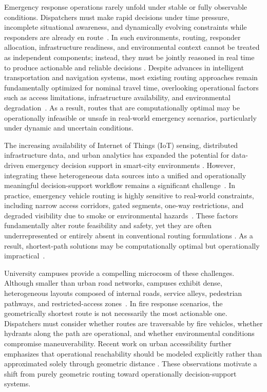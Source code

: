 Emergency response operations rarely unfold under stable or fully observable conditions. Dispatchers must make rapid decisions under time pressure, incomplete situational awareness, and dynamically evolving constraints while responders are already en route~\cite{alvear2013}. In such environments, routing, responder allocation, infrastructure readiness, and environmental context cannot be treated as independent components; instead, they must be jointly reasoned in real time to produce actionable and reliable decisions \cite{zografos2002}. Despite advances in intelligent transportation and navigation systems, most existing routing approaches remain fundamentally optimized for nominal travel time, overlooking operational factors such as access limitations, infrastructure availability, and environmental degradation~\cite{jesus2024}. As a result, routes that are computationally optimal may be operationally infeasible or unsafe in real-world emergency scenarios, particularly under dynamic and uncertain conditions.

The increasing availability of Internet of Things (IoT) sensing, distributed infrastructure data, and urban analytics has expanded the potential for data-driven emergency decision support in smart-city environments \cite{asensio2015}. However, integrating these heterogeneous data sources into a unified and operationally meaningful decision-support workflow remains a significant challenge~\cite{park2018}. In practice, emergency vehicle routing is highly sensitive to real-world constraints, including narrow access corridors, gated segments, one-way restrictions, and degraded visibility due to smoke or environmental hazards~\cite{hong2023}. These factors fundamentally alter route feasibility and safety, yet they are often underrepresented or entirely absent in conventional routing formulations \cite{shaaban2019}. As a result, shortest-path solutions may be computationally optimal but operationally impractical~\cite{zhen2024}.

University campuses provide a compelling microcosm of these challenges. Although smaller than urban road networks, campuses exhibit dense, heterogeneous layouts composed of internal roads, service alleys, pedestrian pathways, and restricted-access zones~\cite{sun2024}. In fire response scenarios, the geometrically shortest route is not necessarily the most actionable one. Dispatchers must consider whether routes are traversable by fire vehicles, whether hydrants along the path are operational, and whether environmental conditions compromise maneuverability. Recent work on urban accessibility further emphasizes that operational reachability should be modeled explicitly rather than approximated solely through geometric distance \cite{baik2025}. These observations motivate a shift from purely geometric routing toward operationally decision-support systems.

